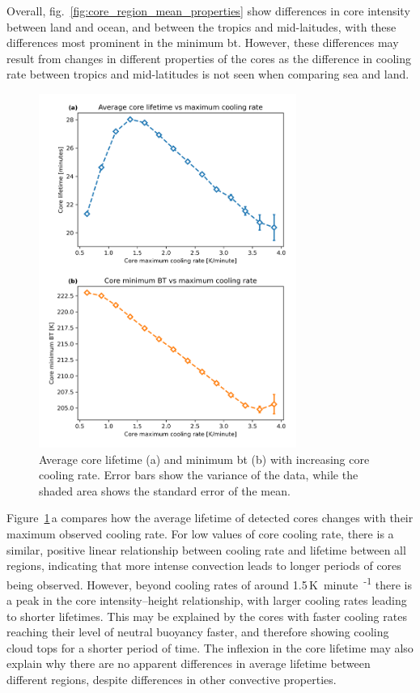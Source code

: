 Overall, fig.~\ref{fig:core_region_mean_properties} show differences in core intensity between land and ocean, and between the tropics and mid-laitudes, with these differences most prominent in the minimum \acrshort{bt}.
However, these differences may result from changes in different properties of the cores as the difference in cooling rate between tropics and mid-latitudes is not seen when comparing sea and land.

\begin{figure}[tp]
    \centering
    \includegraphics[width=0.75\textwidth]{figures/chapter2_10.png}
    \caption[
    Average core lifetime and minimum \acrshort{bt} with increasing core cooling rate
    ]{
    Average core lifetime (a) and minimum \acrshort{bt} (b) with increasing core cooling rate. Error bars show the variance of the data, while the shaded area shows the standard error of the mean.
    }
    \label{fig:core_cooling_rate_relations}
\end{figure}


Figure~\ref{fig:core_cooling_rate_relations}\,a compares how the average lifetime of detected cores changes with their maximum observed cooling rate.
For low values of core cooling rate, there is a similar, positive linear relationship between cooling rate and lifetime between all regions, indicating that more intense convection leads to longer periods of cores being observed.
However, beyond cooling rates of around 1.5\,\unit{K minute\textsuperscript{-1}} there is a peak in the core intensity--height relationship, with larger cooling rates leading to shorter lifetimes.
This may be explained by the cores with faster cooling rates reaching their level of neutral buoyancy faster, and therefore showing cooling cloud tops for a shorter period of time.
The inflexion in the core lifetime may also explain why there are no apparent differences in average lifetime between different regions, despite differences in other convective properties.

